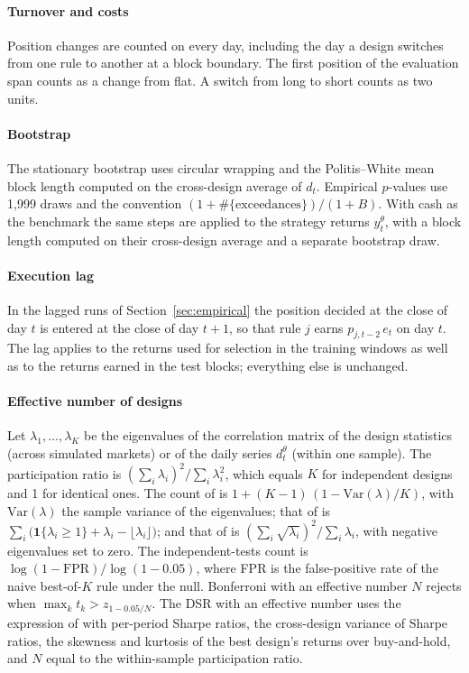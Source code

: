 \documentclass[pdflatex,sn-basic]{sn-jnl}
\theoremstyle{thmstyleone}
\theoremstyle{thmstylethree}
\begin{document}
\begin{appendices}
\paragraph{Turnover and costs} Position changes are counted on every day, including the day a design
switches from one rule to another at a block boundary. The first position of the evaluation span counts
as a change from flat. A switch from long to short counts as two units.

\paragraph{Bootstrap} The stationary bootstrap uses circular wrapping and the Politis--White mean block
length computed on the cross-design average of $d_t$. Empirical $p$-values use 1,999 draws and the
convention $(1+\#\{\text{exceedances}\})/(1+B)$. With cash as the benchmark the same steps are applied to
the strategy returns $y^{\theta}_t$, with a block length computed on their cross-design average and a
separate bootstrap draw.

\paragraph{Execution lag} In the lagged runs of Section~\ref{sec:empirical} the position decided at the
close of day $t$ is entered at the close of day $t+1$, so that rule $j$ earns $p_{j,t-2}\,e_t$ on day
$t$. The lag applies to the returns used for selection in the training windows as well as to the returns
earned in the test blocks; everything else is unchanged.

\paragraph{Effective number of designs} Let $\lambda_1,\dots,\lambda_K$ be the eigenvalues of the
correlation matrix of the design statistics (across simulated markets) or of the daily series
$d^{\theta}_t$ (within one sample). The participation ratio is $(\sum_i\lambda_i)^2/\sum_i\lambda_i^2$,
which equals $K$ for independent designs and 1 for identical ones. The count of \citet{nyholt2004} is
$1+(K-1)\,(1-\mathrm{Var}(\lambda)/K)$, with $\mathrm{Var}(\lambda)$ the sample variance of the
eigenvalues; that of \citet{li2005} is $\sum_i\bigl(\mathbf{1}\{\lambda_i\ge 1\}+\lambda_i-\lfloor\lambda_i\rfloor\bigr)$;
and that of \citet{galwey2009} is $(\sum_i\sqrt{\lambda_i})^2/\sum_i\lambda_i$, with negative eigenvalues
set to zero. The independent-tests count is $\log(1-\mathrm{FPR})/\log(1-0.05)$, where FPR is the
false-positive rate of the naive best-of-$K$ rule under the null. Bonferroni with an effective number
$N$ rejects when $\max_k t_k>z_{1-0.05/N}$. The DSR with an effective number uses the expression of
\citet{bailey2014dsr} with per-period Sharpe ratios, the cross-design variance of Sharpe ratios, the
skewness and kurtosis of the best design's returns over buy-and-hold, and $N$ equal to the within-sample
participation ratio.


\end{appendices}
\end{document}
